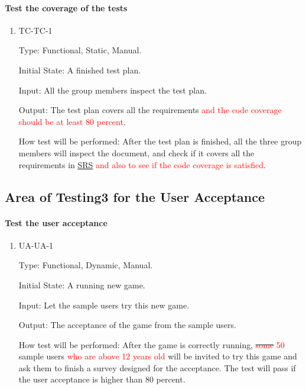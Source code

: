 \documentclass[12pt, titlepage]{article}
\begin{document}
\paragraph{Test the coverage of the tests}

\begin{enumerate}

\item{TC-TC-1}

Type: Functional, Static, Manual.
					
Initial State: A finished test plan.
					
Input: All the group members inspect the test plan.
					
Output: The test plan covers all the requirements \textcolor{red}{and the code coverage should be at least 80 percent}.
					
How test will be performed: After the test plan is finished, all the three group members will inspect the document, and check if it covers all the requirements in \underline{SRS} \textcolor{red}{and also to see if the code coverage is satisfied}.

\end{enumerate}

\subsection{Area of Testing3 for the User Acceptance}

\paragraph{Test the user acceptance}

\begin{enumerate}

\item{UA-UA-1}

Type: Functional, Dynamic, Manual.
					
Initial State: A running new game.
					
Input: Let the sample users try this new game.
					
Output: The acceptance of the game from the sample users.
					
How test will be performed: After the game is correctly running, \sout{\textcolor{red}{some}} \textcolor{red}{50} sample users \textcolor{red}{who are above 12 years old} will be invited to try this game and ask them to finish a survey designed for the acceptance. The test will pass if the user acceptance is higher than 80 percent.

\end{enumerate}
\end{document}

